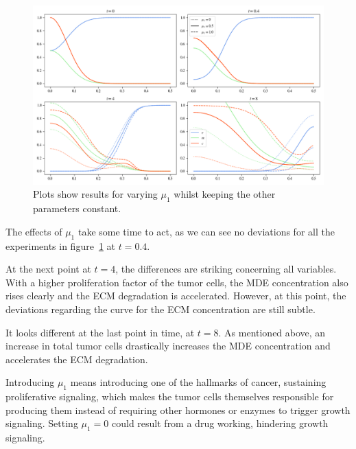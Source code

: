 \begin{figure}[h]
 \centering
 \includegraphics[width=\textwidth]{resources/images/prolif_mu_1_variation.png}
 \caption{Plots show results for varying $\mu_1$ whilst keeping the other parameters constant.}
 \label{fig:prolif_mu_1_variation}
\end{figure}
The effects of $\mu_1$ take some time to act, as we can see no deviations for all the experiments in figure~\ref{fig:prolif_mu_1_variation} at $t=0.4$.

At the next point at $t=4$, the differences are striking concerning all variables. With a higher proliferation factor of the tumor cells, the MDE concentration also rises clearly and the ECM degradation is accelerated. However, at this point, the deviations regarding the curve for the ECM concentration are still subtle.

It looks different at the last point in time, at $t=8$. As mentioned above, an increase in total tumor cells drastically increases the MDE concentration and accelerates the ECM degradation.

Introducing $\mu_1$ means introducing one of the hallmarks of cancer, sustaining proliferative signaling, which makes the tumor cells themselves responsible for producing them instead of requiring other hormones or enzymes to trigger growth signaling. Setting $\mu_1=0$ could result from a drug working, hindering growth signaling.

